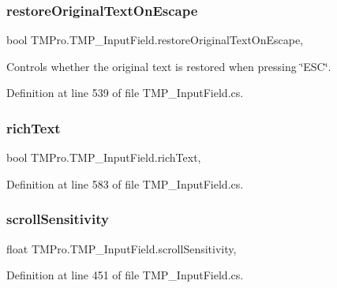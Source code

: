 \subsubsection{\texorpdfstring{restoreOriginalTextOnEscape}{restoreOriginalTextOnEscape}}
{\footnotesize\ttfamily bool T\+M\+Pro.\+T\+M\+P\+\_\+\+Input\+Field.\+restore\+Original\+Text\+On\+Escape\hspace{0.3cm}{\ttfamily [get]}, {\ttfamily [set]}}



Controls whether the original text is restored when pressing \char`\"{}\+E\+S\+C\char`\"{}. 



Definition at line 539 of file T\+M\+P\+\_\+\+Input\+Field.\+cs.

\mbox{\label{class_t_m_pro_1_1_t_m_p___input_field_a5e4d09d36172c6647cf70dc6223c6bfa}} 
\subsubsection{\texorpdfstring{richText}{richText}}
{\footnotesize\ttfamily bool T\+M\+Pro.\+T\+M\+P\+\_\+\+Input\+Field.\+rich\+Text\hspace{0.3cm}{\ttfamily [get]}, {\ttfamily [set]}}



Definition at line 583 of file T\+M\+P\+\_\+\+Input\+Field.\+cs.

\mbox{\label{class_t_m_pro_1_1_t_m_p___input_field_afcc210fa4443bf1e44612d6e525d5047}} 
\subsubsection{\texorpdfstring{scrollSensitivity}{scrollSensitivity}}
{\footnotesize\ttfamily float T\+M\+Pro.\+T\+M\+P\+\_\+\+Input\+Field.\+scroll\+Sensitivity\hspace{0.3cm}{\ttfamily [get]}, {\ttfamily [set]}}



Definition at line 451 of file T\+M\+P\+\_\+\+Input\+Field.\+cs.

